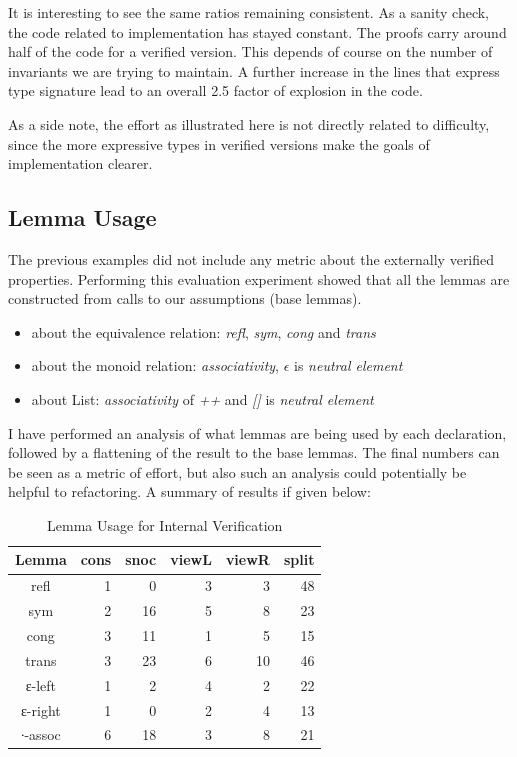 \documentclass[12pt,twoside,notitlepage]{report}
\begin{document}
It is interesting to see the same ratios remaining consistent. As a sanity check, the code related to implementation has stayed constant. The proofs carry around half of the code for a verified version. This depends of course on the number of invariants we are trying to maintain. A further increase in the lines that express type signature lead to an overall 2.5 factor of explosion in the code.

As a side note, the effort as illustrated here is not directly related to difficulty, since the more expressive types in verified versions make the goals of implementation clearer.

\subsection{Lemma Usage}
\label{eval:lemma}
The previous examples did not include any metric about the externally verified properties. 
Performing this evaluation experiment showed that all the lemmas are constructed from calls to our assumptions (base lemmas).

\begin{itemize}
\item about the equivalence relation: \textit{refl}, \textit{sym}, \textit{cong} and \textit{trans}
\item about the monoid relation: \textit{associativity}, $\epsilon$ is \textit{neutral element}
\item about List: \textit{associativity} of \textit{++} and \textit{[]} is \textit{neutral element}
\end{itemize} 

I have performed an analysis of what lemmas are being used by each declaration, followed by a flattening of the result to the base lemmas. The final numbers can be seen as a metric of effort, but also such an analysis could potentially be helpful to refactoring. A summary of results if given below:

\begin{table}[H]
\caption{Lemma Usage for Internal Verification}
\center
\begin{tabular}{c r r r r r}
\hline 
Lemma & cons & snoc & viewL & viewR & split \\
\hline
refl  	&	1	&	0	&	3&	3&  48\\
sym     &	2	&	16	&	5&	8&	23\\
cong   	&	3	&	11	&	1&	5&	15\\
trans  	&	3	&	23	&	6&	10& 46\\
ε-left  &	1	&	2	&	4&	2& 22\\  
ε-right &	1	&	0	&	2&	4& 13\\
∙-assoc &	6	&	18	&	3&	8& 21\\
\hline
\end{tabular}
\end{table} 
\end{document}
